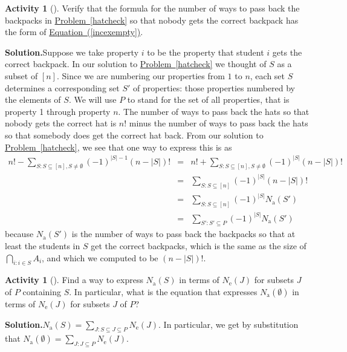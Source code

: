 \documentclass[10pt,]{book}
\theoremstyle{plain}
\theoremstyle{definition}
\newtheorem{activity}[project]{Activity}
\numberwithin{equation}{chapter}
\newcommand{\amp}{&}
\begin{document}
\begin{activity}[]\label{activity-214}
Verify that the formula for the number of ways to pass back the backpacks in \hyperref[hatcheck]{Problem~\ref{hatcheck}} so that nobody gets the correct backpack has the form of \hyperref[incexempty]{Equation~(\ref{incexempty})}.%
\par\medskip\noindent%
\textbf{Solution.}\quad Suppose we take property \(i\) to be the property that student \(i\) gets the correct backpack. In our solution to \hyperref[hatcheck]{Problem~\ref{hatcheck}} we thought of \(S\) as a subset of \([n]\). Since we are numbering our properties from \(1\) to \(n\), each set \(S\) determines a corresponding set \(S'\) of properties: those properties numbered by the elements of \(S\). We will use \(P\) to stand for the set of all properties, that is property 1 through property \(n\). The number of ways to pass back the hats so that nobody gets the correct hat is \(n!\) minus the number of ways to pass back the hats so that somebody does get the correct hat back. From our solution to \hyperref[hatcheck]{Problem~\ref{hatcheck}}, we see that one way to express this is as%
\begin{align*}
n!-\sum_{S:
S\subseteq [n], S\not=\emptyset}(-1)^{|S|-1} (n-|S|)!\amp =\amp
n!+\sum_{S:
S\subseteq [n], S\not=\emptyset}(-1)^{|S|} (n-|S|)!\\
\amp =\amp
\sum_{S:
S\subseteq [n]}(-1)^{|S|} (n-|S|)!\\
\amp =\amp \sum_{S:
S\subseteq [n]}(-1)^{|S|} N_{\mbox{a} }(S')\\
\amp =\amp
\sum_{S':
S'\subseteq P}(-1)^{|S|} N_{\mbox{a} }(S')
\end{align*}
because \(N_{\mbox{a} }(S')\) is the number of ways to pass back the backpacks so that at least the students in \(S\) get the correct backpacks, which is the same as the size of \(\bigcap_{i:i\in S} A_i\), and which we computed to be \((n-|S|)!\).%
\end{activity}
\begin{activity}[]\label{incexsystemeq}
Find a way to express \(N_{\mbox{a} }(S)\) in terms of \(N_{\mbox{e} }(J)\) for subsets \(J\) of \(P\) containing \(S\). In particular, what is the equation that expresses \(N_{\mbox{a} }(\emptyset)\) in terms of \(N_{\mbox{e} }(J)\) for subsets \(J\) of \(P\)?%
\par\medskip\noindent%
\textbf{Solution.}\quad \(N_{\mbox{a} }(S) = \sum_{J: S\subseteq
J\subseteq P}N_{\mbox{e} }(J)\). In particular, we get by substitution that \(N_{\mbox{a} }(\emptyset)=\sum_{J:J\subseteq P} N_{\mbox{e} }(J)\).%
\end{activity}
\end{document}
